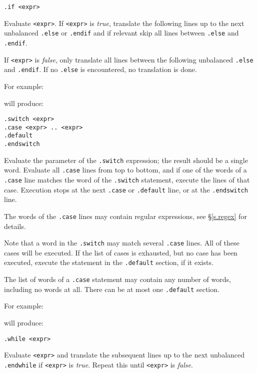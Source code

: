 \begin{verbatim}
.if <expr>
\end{verbatim}
\begin{desc}
Evaluate \texttt{<expr>}.
If \texttt{<expr>} is {\it true},
translate the following lines up to the next unbalanced
\texttt{.else} or \texttt{.endif}
and if relevant skip all lines between \texttt{.else} and \texttt{.endif}.

If \texttt{<expr>} is {\it false},
only translate all lines between the following unbalanced
\texttt{.else} and \texttt{.endif}.
If no \texttt{.else} is encountered, no translation is done.

For example:
\begin{showfile}

\end{showfile}
will produce:
\begin{showfile}

\end{showfile}
\end{desc}
\begin{verbatim}
.switch <expr>
.case <expr> .. <expr>
.default
.endswitch
\end{verbatim}
\begin{desc}
Evaluate the parameter of the \verb'.switch' expression; the result
should be a single word. Evaluate all \verb'.case' lines from top
to bottom, and if one of the words of a \verb'.case' line matches
the word of the \verb'.switch' statement, execute the lines of that case.
Execution stops at the next \verb'.case' or \verb'.default' line,
or at the \verb'.endswitch' line.

The words of the \verb'.case' lines may contain regular
expressions, see \S\ref{s.regex} for details.

Note that a word in the \verb'.switch' may match several \verb'.case'
lines. All of these cases will be executed.
If the list of cases is exhausted, but no case has been executed,
execute the statement in the \verb'.default' section, if it exists.

The list of words of a \verb'.case' statement may contain any number of words,
including no words at all. There can be at most one \verb'.default'
section.

For example:
\begin{showfile}

\end{showfile}
will produce:
\begin{showfile}

\end{showfile}
\end{desc}
\begin{verbatim}
.while <expr>
\end{verbatim}
\begin{desc}
Evaluate \texttt{<expr>} and translate the subsequent lines up to the next
unbalanced \texttt{.endwhile} if \texttt{<expr>} is {\it true}.
Repeat this until \texttt{<expr>} is {\it false}.
\end{desc}
